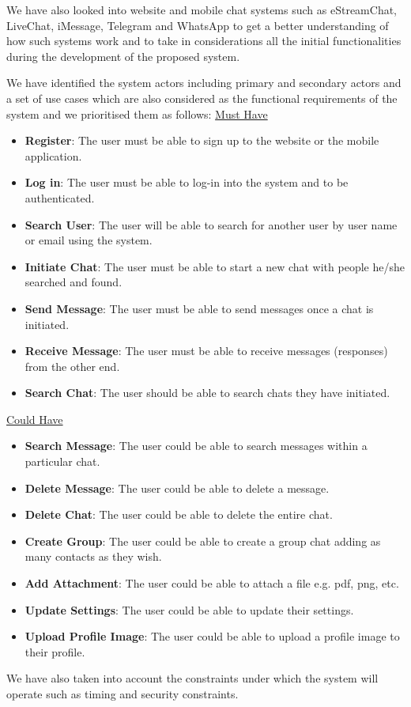 \documentclass{article}
\begin{document}
\begin{flushleft}
We have also looked into website and mobile chat systems such as eStreamChat, LiveChat, iMessage, Telegram and WhatsApp to get a better understanding of how such systems work and to take in considerations all the initial functionalities during the development of the proposed system. 
\end{flushleft}

\begin{flushleft}
We have identified the system actors including primary and secondary actors and a set of use cases which are also considered as the functional requirements of the system and we prioritised them as follows: 
\newline
\underline{Must Have}
\begin{itemize}
\item \textbf{Register}:	The user must be able to sign up to the website or the mobile application. 
\item \textbf{Log in}: The user must be able to log-in into the system and to be authenticated. 
\item \textbf{Search User}: The user will be able to search for another user by user name or email using the system. 
\item \textbf{Initiate Chat}: The user must be able to start a new chat with people he/she searched and found. 
\item \textbf{Send Message}: The user must be able to send messages once a chat is initiated. 
\item \textbf{Receive Message}: The user must be able to receive messages (responses) from the other end. 
\item \textbf{Search Chat}: The user should be able to search chats they have initiated. 
\end{itemize}

\underline{Could Have}
\begin{itemize}
\item \textbf{Search Message}: The user could be able to search messages within a particular chat. 
\item \textbf{Delete Message}: The user could be able to delete a message.
\item \textbf{Delete Chat}: The user could be able to delete the entire chat. 
\item \textbf{Create Group}: The user could be able to create a group chat adding as many contacts as they wish. 
\item \textbf{Add Attachment}: The user could be able to attach a file e.g. pdf, png, etc.
\item \textbf{Update Settings}: The user could be able to update their settings. 
\item \textbf{Upload Profile Image}: The user could be able to upload a profile image to their profile. 
\end{itemize}
We have also taken into account the constraints under which the system will operate such as timing and security constraints. 
\end{flushleft}
\end{document}
